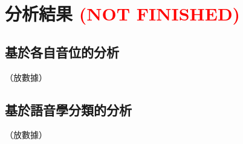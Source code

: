 
\section{分析結果 \textcolor{red}{(NOT FINISHED)}}
\subsection{基於各自音位的分析}
（放數據）
\subsection{基於語音學分類的分析}
（放數據）
